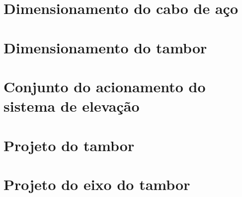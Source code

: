 \section{Dimensionamento do cabo de aço}


\section{Dimensionamento do tambor}


\section{Conjunto do acionamento do sistema de elevação}


\section{Projeto do tambor}


\section{Projeto do eixo do tambor}

